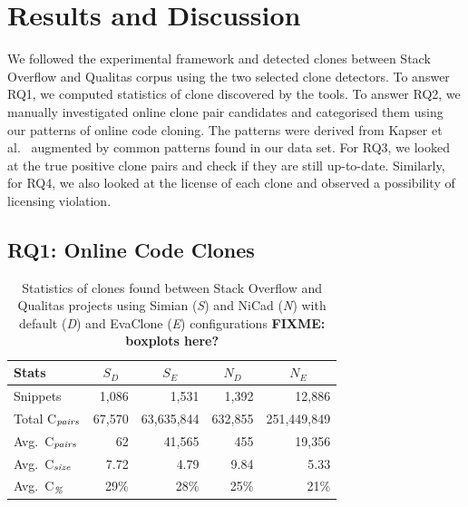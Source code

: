 \documentclass[sigconf,review, anonymous]{acmart}
\newcommand\FIXME[1]{\textbf{FIXME: #1}}
\begin{document}
\section{Results and Discussion}

We followed the experimental framework and detected clones between Stack Overflow and Qualitas corpus using the two selected clone detectors. To answer RQ1, we computed statistics of clone discovered by the tools. To answer RQ2, we manually investigated online clone pair candidates and categorised them using our patterns of online code cloning. The patterns were derived from Kapser et al.~\cite{Kapser2003} augmented by common patterns found in our data set. For RQ3, we looked at the true positive clone pairs and check if they are still up-to-date. Similarly, for RQ4, we also looked at the license of each clone and observed a possibility of licensing violation.

\subsection{RQ1: Online Code Clones} 

\begin{table}
	\centering
	\caption{Statistics of clones found between Stack Overflow and Qualitas projects using Simian (\textit{S}) and NiCad (\textit{N}) with default (\textit{D}) and EvaClone (\textit{E}) configurations \FIXME{boxplots here?}}
	\label{tab:raw_stats}
	\small
		\begin{tabular}{l|r|r|r|r}
			\hline
			Stats & \multicolumn{1}{c|}{$S_D$} & \multicolumn{1}{c|}{$S_E$} & \multicolumn{1}{c|}{$N_D$} & \multicolumn{1}{c}{$N_E$} \\
			\hline
			Snippets & 1,086 & 1,531 & 1,392 & 12,886 \\
			Total C$_{\textrm{\textit{pairs}}}$ & 67,570 & 63,635,844 & 632,855 & 251,449,849 \\
			Avg.~C$_{\textrm{\textit{pairs}}}$ & 62 & 41,565 & 455 & 19,356 \\
			Avg.~C$_{\textrm{\textit{size}}}$ & 7.72 & 4.79 & 9.84 & 5.33 \\
			Avg.~C$_{\textrm{\textit{\%}}}$ & 29\% & 28\% & 25\% & 21\% \\
			\hline
		\end{tabular} %
\end{table}
\end{document}
